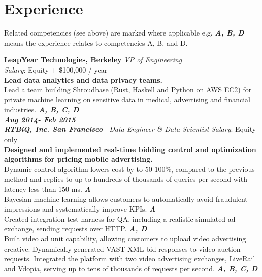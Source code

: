 \documentclass[11pt, a4paper]{article}
\newcommand{\years}[1]{\marginnote{\scriptsize #1}}
\begin{document}
\section*{\color{mycolor4}Experience} \singlespace Related competencies (see above) are marked where applicable e.g. \textit{\textbf{{\color{mycolor1}A, B, D}}} means the experience relates to competencies A, B, and D. \newline


\years{ March 2015- Present}\textbf{LeapYear Technologies, Berkeley}
\emph{VP of Engineering} \\
\textit{Salary}: Equity +  \$100,000 / year\\
 \textbf{{\color{mycolor2}Lead data analytics and data privacy teams.}}
    \\ \textbullet Lead a team building Shroudbase (Rust, Haskell and Python on AWS EC2) for private machine learning on sensitive data in medical, advertising and financial industries. \textit{\textbf{{\color{mycolor1}A, B, C, D}}} \newline
\noindent
\\
\textit{\textbf{Aug 2014- Feb 2015}\\\textbf{\emph{RTBiQ, Inc. San Francisco}} }| \emph{Data Engineer \& Data Scientist} \newline
\textit{Salary}: Equity only \\
 \textbf{{\color{mycolor2}Designed and implemented real-time bidding control and optimization algorithms for pricing mobile advertising.}} \\ \textbullet Dynamic control algorithm lowers cost by to 50-100\%, compared to the previous method and replies to up to hundreds of thousands of queries per second with latency less than 150 ms. \textit{\textbf{{\color{mycolor1}A}}} \\ \textbullet Bayesian machine learning allows customers to automatically avoid fraudulent impressions and systematically improve KPIs. \textit{\textbf{{\color{mycolor1}A}}}\\ \textbullet 
Created integration test harness for QA, including a realistic simulated ad exchange, sending requests over HTTP. \textit{\textbf{{\color{mycolor1}A, D}}}%
\\ \textbullet Built video ad unit capability, allowing customers to upload video advertising creative. Dynamically generated VAST XML bid responses to video auction requests. Integrated the platform with two video advertising exchanges, LiveRail and Vdopia, serving up to tens of thousands of requests per second. \textit{\textbf{{\color{mycolor1}A, B, C, D}}}\\
\end{document}

